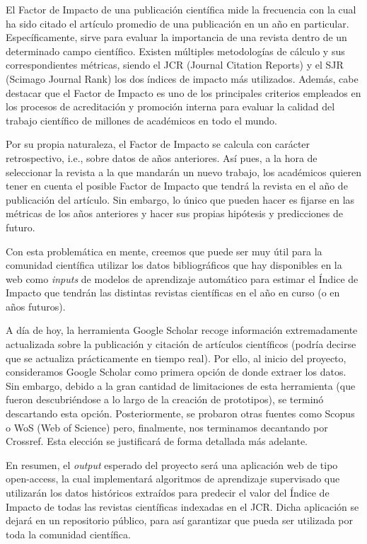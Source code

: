 
El Factor de Impacto de una publicación científica mide la frecuencia con la cual ha sido citado el artículo promedio de una publicación en un año en particular. Específicamente, sirve para evaluar la importancia de una revista dentro de un determinado campo científico. Existen múltiples metodologías de cálculo y sus correspondientes métricas, siendo el JCR (Journal Citation Reports) y el SJR (Scimago Journal Rank) los dos índices de impacto más utilizados.
Además, cabe destacar que el Factor de Impacto es uno de los principales criterios empleados en los procesos de acreditación y promoción interna para evaluar la calidad del trabajo científico de millones de académicos en todo el mundo.

Por su propia naturaleza, el Factor de Impacto se calcula con carácter retrospectivo, i.e., sobre datos de años anteriores. Así pues, a la hora de seleccionar la revista a la que mandarán un nuevo trabajo, los académicos quieren tener en cuenta el posible Factor de Impacto que tendrá la revista en el año de publicación del artículo. Sin embargo, lo único que pueden hacer es fijarse en las métricas de los años anteriores y hacer sus propias hipótesis y predicciones de futuro.

Con esta problemática en mente, creemos que puede ser muy útil para la comunidad científica utilizar los datos bibliográficos que hay disponibles en la web como \textit{inputs} de modelos de aprendizaje automático para estimar el Índice de Impacto que tendrán las distintas revistas científicas en el año en curso (o en años futuros).

A día de hoy, la herramienta Google Scholar recoge información extremadamente actualizada sobre la publicación y citación de artículos científicos (podría decirse que se actualiza prácticamente en tiempo real). Por ello, al inicio del proyecto, consideramos Google Scholar como primera opción de donde extraer los datos. Sin embargo, debido a la gran cantidad de limitaciones de esta herramienta (que fueron descubriéndose a lo largo de la creación de prototipos), se terminó descartando esta opción. Posteriormente, se probaron otras fuentes como Scopus o WoS (Web of Science) pero, finalmente, nos terminamos decantando por Crossref. Esta elección se justificará de forma detallada más adelante.

En resumen, el \textit{output} esperado del proyecto será una aplicación web de tipo open-access, la cual implementará algoritmos de aprendizaje supervisado que utilizarán los datos históricos extraídos para predecir el valor del Índice de Impacto de todas las revistas científicas indexadas en el JCR. Dicha aplicación se dejará en un repositorio público, para así garantizar que pueda ser utilizada por toda la comunidad científica. 

